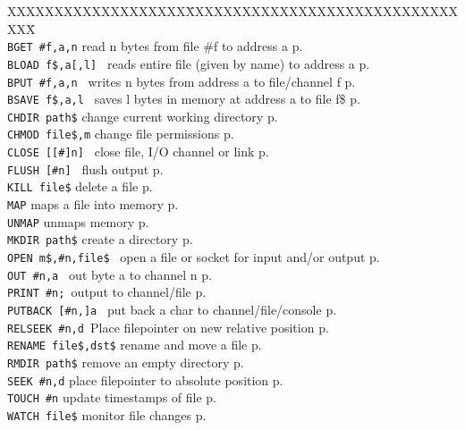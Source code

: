 \begin{tabbing}
XXXXXXXXXXXXXXXXXXX\=XXXXXXXXXXXXXXXXXXXXXXXXXXXXXXXX\=\kill\\
{\tt BGET \#f,a,n}\> read n bytes from file \#f to address a\> p.\pageref{BGET}\\
{\tt BLOAD f\$,a[,l]	}\> reads entire file (given by name) to address a\> p.\pageref{BLOAD}\\
{\tt BPUT \#f,a,n	}\> writes n bytes from address a to file/channel f\> p.\pageref{BPUT}\\
{\tt BSAVE f\$,a,l	}\> saves l bytes in memory at address a to file f\$\> p.\pageref{BSAVE}\\
\verb|CHDIR path$|       \> change current working directory\> p.\pageref{CHDIR}\\
\verb|CHMOD file$,m|     \> change file permissions \> p.\pageref{CHMOD}\\
{\tt CLOSE  [[\#]n]  }	\> close file, I/O channel or link\> p.\pageref{CLOSE}\\
{\tt FLUSH [\#n]	}\> flush output\> p.\pageref{FLUSH}\\
\verb|KILL file$|       \> delete a file \> p.\pageref{KILL}\\
\verb|MAP|       \> maps a file into memory \> p.\pageref{MAP}\\
\verb|UNMAP|       \> unmaps memory \> p.\pageref{UNMAP}\\
\verb|MKDIR path$|       \> create a directory \> p.\pageref{MKDIR}\\
{\tt OPEN m\$,\#n,file\$ }\>  open a file or socket for input and/or output\> p.\pageref{OPEN}\\
{\tt OUT \#n,a		}\> out byte a to channel n\> p.\pageref{OUT}\\
{\tt PRINT \#n;		}\>output to channel/file      \> p.\pageref{PRINT}\\
{\tt PUTBACK [\#n,]a 	}\> put back a char to channel/file/console\> p.\pageref{PUTBACK}\\
{\tt RELSEEK \#n,d	}\>Place filepointer on new relative position\> p.\pageref{RELSEEK}\\
\verb|RENAME file$,dst$| \> rename and move a file     \> p.\pageref{RENAME}\\
\verb|RMDIR path$|       \> remove an empty directory  \> p.\pageref{RMDIR}\\
\verb|SEEK #n,d|	 \> place filepointer to absolute position\> p.\pageref{SEEK}\\
\verb|TOUCH #n| 	 \> update timestamps of file  \> p.\pageref{TOUCH}\\
\verb|WATCH file$|       \> monitor file changes       \> p.\pageref{WATCH}\\
\end{tabbing}


